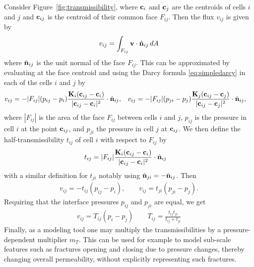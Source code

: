 Consider Figure~\ref{fig:transmissibility}, where ${\bf c}_i$ and
${\bf c}_j$ are the centroids of cells $i$ and $j$ and ${\bf c}_{ij}$ is the
centroid of their common face $F_{ij}$. Then the
flux $v_{ij}$ is given by
\begin{equation}
  v_{ij}  = \int_{F_{ij}} {\bf v} \cdot \hat{{\bf n}}_{ij} \, dA
\end{equation}
where $\hat{{\bf n}}_{ij}$ is the unit normal of the face $F_{ij}$. This can
be approximated by evaluating at the face centroid and using the Darcy
formula \eqref{eq:simpledarcy} in each of the cells $i$ and $j$ by
\begin{align}
  v_{ij} & = -|F_{ij}| (p_{ij} - p_i) \frac{{\bf K}_i ({\bf c}_{ij} -
           {\bf c}_i)}{|{\bf c}_{ij} - {\bf c}_i|^2} \cdot \hat{{\bf n}}_{ij},  &
  v_{ij} & = -|F_{ij}| (p_{ji} - p_{j}) \frac{{\bf K}_j ({\bf c}_{ij} -
           {\bf c}_{j})}{|{\bf c}_{ij} - {\bf c}_{j}|^2} \cdot \hat{{\bf n}}_{ij},
\end{align}
where $|F_{ij}|$ is the area of the face $F_{ij}$ between cells $i$
and $j$, $p_{ij}$ is the pressure in cell $i$ at the point ${\bf c}_{ij}$,
and $p_{ji}$ the pressure in cell $j$ at ${\bf c}_{ij}$. We then define
the half-transmissibility $t_{ij}$ of cell $i$ with respect to
$F_{ij}$ by
\begin{align}
  t_{ij} & =  |F_{ij}| \frac{{\bf K}_i ({\bf c}_{ij} -
           {\bf c}_i)}{|{\bf c}_{ij} - {\bf c}_i|^2} \cdot \hat{{\bf n}}_{ij}
\end{align}
with a similar definition for $t_{ji}$ notably using
$\hat{{\bf n}}_{ji} = -\hat{{\bf n}}_{ij}$. Then
\begin{align}
  v_{ij}  = -t_{ij} (p_{ij} - p_i), \qquad
  v_{ij}  = t_{ji} (p_{ji} - p_{j}).
\end{align}
Requiring that the interface pressures $p_{ij}$ and $p_{ji}$ are
equal, we get
\begin{align}
  v_{ij}  = T_{ij}(p_i - p_j) \qquad 
  T_{ij}  = \frac{t_{ij} t_{ji}}{t_{ij} + t_{ji}}
\end{align}
Finally, as a modeling tool one may multiply the transmissibilities by
a pressure-dependent multiplier $m_T$. This can be used for example to
model sub-scale features such as fractures opening and closing due to
pressure changes, thereby changing overall permeability, without
explicitly representing such fractures.
